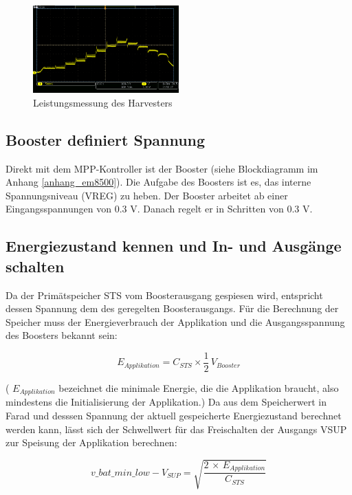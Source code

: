 \begin{figure}[ht]
    \includegraphics[width=0.5\textwidth]{2TheoretischeGrundlagen/imag/RegelungVHRV.png}
    \caption{Leistungsmessung des Harvesters}
    \label{RegelungSpannung} 
\end{figure}


\subsection{Booster definiert Spannung}

Direkt mit dem MPP-Kontroller ist der Booster (siehe Blockdiagramm im Anhang \ref{anhang_em8500}). Die Aufgabe des Boosters ist es, das interne Spannungsniveau (VREG) zu heben. Der Booster arbeitet ab einer Eingangsspannungen von 0.3 V. Danach regelt er in Schritten von 0.3 V. 

\subsection{Energiezustand kennen und In- und Ausgänge schalten}

Da der Primätspeicher STS vom Boosterausgang gespiesen wird, entspricht dessen Spannung dem des geregelten Boosterausgangs. Für die Berechnung der Speicher muss der Energieverbrauch der Applikation und die Ausgangsspannung des Boosters bekannt sein:

\begin{equation}
  E_{Applikation}= C_{STS} \times \frac{1}{2}\, V_{Booster}
\end{equation}
 
( $E_{Applikation}$ bezeichnet die  minimale Energie, die die Applikation braucht, also mindestens die Initialisierung der Applikation.) Da aus dem Speicherwert in Farad und desssen Spannung der aktuell gespeicherte Energiezustand berechnet werden kann, lässt sich der Schwellwert für das Freischalten der Ausgangs VSUP zur Speisung der Applikation berechnen:

\begin{equation}
v\_bat\_min\_low - V_{SUP} = \sqrt{\frac{2\, \times \, E_{Applikation}}{C_{STS}}}
\end{equation}

